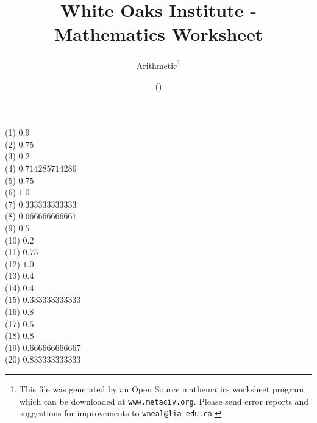 \documentclass[letter]{article}
\begin{document}
\title{White Oaks Institute - Mathematics Worksheet}
\author{Arithmetic\thanks{This file was generated by an \textsf{Open Source} mathematics worksheet program which can be downloaded at \texttt{www.metaciv.org}. Please send error reports and suggestions for improvements to \texttt{wneal@lia-edu.ca}.}}
\date{\XCfileversion{} (\XCfiledate)}
\maketitle
\setlength{\parskip}{12mm plus 4mm minus 4mm}\setlength{\parindent}{0cm}\begin{multicols}{2}(1) $0.9$\\(2) $0.75$\\(3) $0.2$\\(4) $0.714285714286$\\(5) $0.75$\\(6) $1.0$\\(7) $0.333333333333$\\(8) $0.666666666667$\\(9) $0.5$\\(10) $0.2$\\(11) $0.75$\\(12) $1.0$\\(13) $0.4$\\(14) $0.4$\\(15) $0.333333333333$\\(16) $0.8$\\(17) $0.5$\\(18) $0.8$\\(19) $0.666666666667$\\(20) $0.833333333333$\\\end{multicols}
\end{document}
